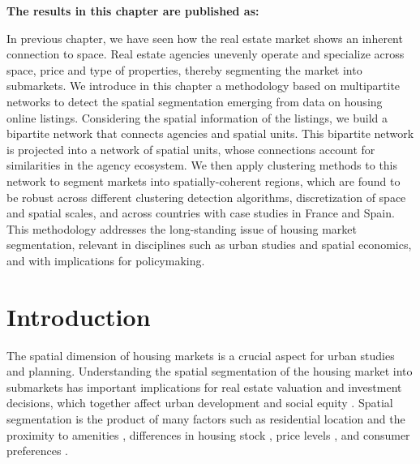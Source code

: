 \vspace{-1.5cm}
\small
\textbf{The results in this chapter are published as:}
\vspace{0.05 cm}

\normalsize
\vspace{0.5 cm}

In previous chapter, we have seen how the real estate market shows an inherent connection to space. Real estate agencies unevenly operate and specialize across space, price and type of properties, thereby segmenting the market into submarkets. We introduce in this chapter a methodology based on multipartite networks to detect the spatial segmentation emerging from data on housing online listings. Considering the spatial information of the listings, we build a bipartite network that connects agencies and spatial units. This bipartite network is projected into a network of spatial units, whose connections account for similarities in the agency ecosystem. We then apply clustering methods to this network to segment  markets into spatially-coherent regions, which are found to be robust across different clustering detection algorithms, discretization of space and spatial scales, and across countries with case studies in France and Spain. This methodology addresses the long-standing issue of housing market segmentation, relevant in disciplines such as urban studies and spatial economics, and with implications for policymaking. 

\section{Introduction}
\label{sec:introduction}

The spatial dimension of housing markets is a crucial aspect for urban studies and planning. Understanding the spatial segmentation of the housing market into submarkets \cite{morawakage2022housing,bourassa2003housing} has important implications for real estate valuation and investment decisions, which together affect urban development and social equity \cite{bourassa2003housing}. Spatial segmentation is the product of many factors such as residential location and the proximity to amenities \cite{bourassa2003housing}, differences in housing stock \cite{keskin2017defining}, price levels \cite{goodman1998housing}, and consumer preferences \cite{leishman2013predictive}. 

